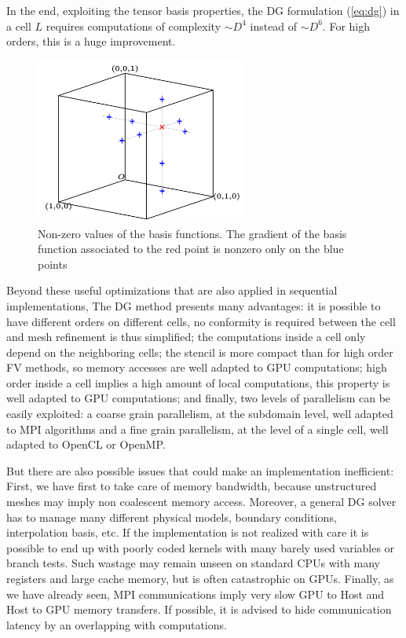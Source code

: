 \documentclass{svmult}
\begin{document}
In the end, exploiting the tensor basis properties, the DG formulation
(\ref{eq:dg}) in a cell $L$ requires computations of complexity $\sim
D^4$ instead of $\sim D^6$. For high orders, this is a huge
improvement.

\begin{figure}[h]
  \centering
  \includegraphics[width=7cm]{ref_element_cross_pg}
  \caption{Non-zero values of the basis functions. The gradient of the
    basis function associated to the red point is nonzero only on the
    blue points}
  \label{fig:cross}
\end{figure}

Beyond these useful optimizations that are also applied in sequential
implementations, The DG method presents many advantages: it is
possible to have different orders on different cells, no conformity is
required between the cell and mesh refinement is thus simplified; the
computations inside a cell only depend on the neighboring cells; the
stencil is more compact than for high order FV methods, so memory
accesses are well adapted to GPU computations; high order inside a
cell implies a high amount of local computations, this property is
well adapted to GPU computations; and finally, two levels of
parallelism can be easily exploited: a coarse grain parallelism, at
the subdomain level, well adapted to MPI algorithms and a fine grain
parallelism, at the level of a single cell, well adapted to OpenCL or
OpenMP.

But there are also possible issues that could make an implementation
inefficient: First, we have first to take care of memory bandwidth,
because unstructured meshes may imply non coalescent memory access.
Moreover, a general DG solver has to manage many different physical
models, boundary conditions, interpolation basis, etc. If the
implementation is not realized with care it is possible to end up with
poorly coded kernels with many barely used variables or branch
tests. Such wastage may remain unseen on standard CPUs with many
registers and large cache memory, but is often catastrophic on GPUs.
Finally, as we have already seen, MPI communications imply very slow
GPU to Host and Host to GPU memory transfers. If possible, it is
advised to hide communication latency by an overlapping with
computations.
\end{document}
